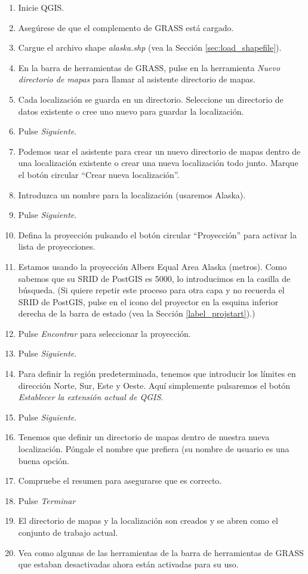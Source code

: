 \begin{enumerate}
  \item Inicie QGIS.
  \item Asegúrese de que el complemento de GRASS está cargado.
  \item Cargue el archivo shape \textsl{alaska.shp} (vea la Sección \ref{sec:load_shapefile}).
  \item En la barra de herramientas de GRASS, pulse en la herramienta \textsl{Nuevo directorio de mapas} para llamar al asistente directorio de mapas.
  \item Cada localización se guarda en un directorio. Seleccione un directorio de datos existente o cree uno nuevo para guardar la localización.
  \item Pulse \textsl{Siguiente}.
  \item Podemos usar el asistente para crear un nuevo directorio de mapas dentro de una localización existente o crear una nueva localización todo junto. Marque el botón circular ``Crear nueva localización''.
  \item Introduzca un nombre para la localización (usaremos Alaska).
  \item Pulse \textsl{Siguiente}.
  \item Defina la proyección pulsando el botón circular ``Proyección'' para activar la lista de proyecciones.
  \item Estamos usando la proyección Albers Equal Area Alaska (metros). Como sabemos que su SRID de PostGIS es 5000, lo introducimos en la casilla de búsqueda. (Si quiere repetir este proceso para otra capa y no recuerda el SRID de PostGIS, pulse en el icono del proyector en la esquina inferior derecha de la barra de estado (vea la Sección \ref{label_projstart}).)
  \item Pulse \textsl{Encontrar} para seleccionar la proyección.
  \item Pulse \textsl{Siguiente}.
  \item Para definir la región predeterminada, tenemos que introducir los límites en dirección Norte, Sur, Este y Oeste. Aquí simplemente pulsaremos el botón \textsl{Establecer la extensión actual de QGIS}.
  \item Pulse \textsl{Siguiente}. 
  \item Tenemos que definir un directorio de mapas dentro de nuestra nueva localización. Póngale el nombre que prefiera (su nombre de usuario es una buena opción.
  \item Compruebe el resumen para asegurarse que es correcto.
  \item Pulse \textsl{Terminar} 
  \item El directorio de mapas y la localización son creados y se abren como el conjunto de trabajo actual.
  \item Vea como algunas de las herramientas de la barra de herramientas de GRASS que estaban desactivadas ahora están activadas para su uso.
\end{enumerate}

